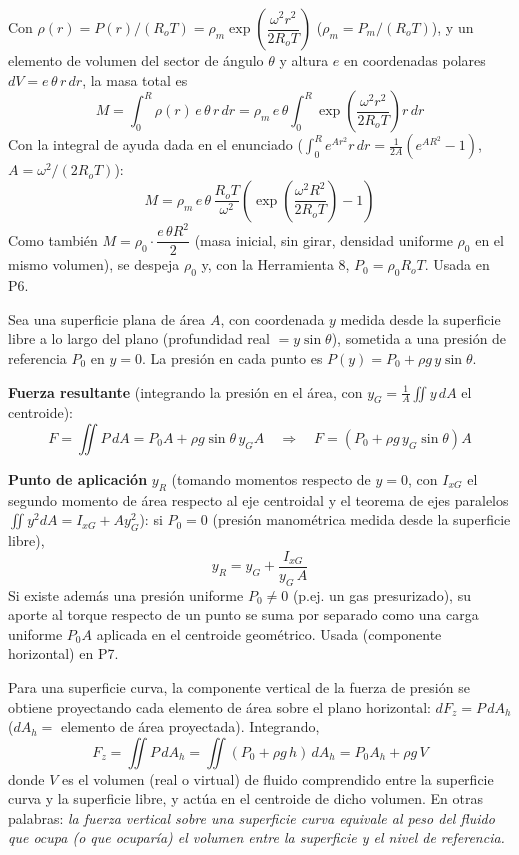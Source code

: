 \documentclass[12pt]{article}
\begin{document}
Con $\rho(r)=P(r)/(R_oT)=\rho_m\exp\!\left(\dfrac{\omega^2r^2}{2R_oT}\right)$
($\rho_m=P_m/(R_oT)$), y un elemento de volumen del sector de \'angulo $\theta$ y
altura $e$ en coordenadas polares $dV=e\,\theta\,r\,dr$, la masa total es
\[
M=\int_0^R \rho(r)\,e\,\theta\,r\,dr
=\rho_m\, e\,\theta\int_0^R \exp\!\left(\frac{\omega^2r^2}{2R_oT}\right) r\,dr
\]
Con la integral de ayuda dada en el enunciado
($\int_0^R e^{Ar^2}r\,dr=\frac{1}{2A}(e^{AR^2}-1)$, $A=\omega^2/(2R_oT)$):
\[
\boxed{M=\rho_m\,e\,\theta\,\frac{R_oT}{\omega^2}\left(\exp\!\left(\frac{\omega^2R^2}{2R_oT}\right)-1\right)}
\]
Como tambi\'en $M=\rho_0\cdot\dfrac{e\,\theta R^2}{2}$ (masa inicial, sin girar, densidad
uniforme $\rho_0$ en el mismo volumen), se despeja $\rho_0$ y, con la Herramienta 8,
$P_0=\rho_0 R_o T$. Usada en P6.


Sea una superficie plana de \'area $A$, con coordenada $y$ medida desde la superficie
libre a lo largo del plano (profundidad real $=y\sin\theta$), sometida a una presi\'on
de referencia $P_0$ en $y=0$. La presi\'on en cada punto es $P(y)=P_0+\rho g\,y\sin\theta$.

\textbf{Fuerza resultante} (integrando la presi\'on en el \'area, con
$y_G=\frac1A\iint y\,dA$ el centroide):
\[
F=\iint P\,dA=P_0A+\rho g\sin\theta\, y_G A
\quad\Longrightarrow\quad
\boxed{F=\left(P_0+\rho g\,y_G\sin\theta\right)A}
\]

\textbf{Punto de aplicaci\'on} $y_R$ (tomando momentos respecto de $y=0$, con
$I_{xG}$ el segundo momento de \'area respecto al eje centroidal y el teorema de ejes
paralelos $\iint y^2dA=I_{xG}+A y_G^2$): si $P_0=0$ (presi\'on manom\'etrica medida
desde la superficie libre),
\[
\boxed{y_R=y_G+\frac{I_{xG}}{y_G\,A}}
\]
Si existe adem\'as una presi\'on uniforme $P_0\neq0$ (p.ej. un gas presurizado), su
aporte al torque respecto de un punto se suma por separado como una carga uniforme
$P_0A$ aplicada en el centroide geom\'etrico. Usada (componente horizontal) en P7.


Para una superficie curva, la componente vertical de la fuerza de presi\'on se obtiene
proyectando cada elemento de \'area sobre el plano horizontal: $dF_z=P\,dA_h$ ($dA_h=$
elemento de \'area proyectada). Integrando,
\[
F_z=\iint P\,dA_h=\iint (P_0+\rho g\,h)\,dA_h=P_0A_h+\rho g\,V
\]
donde $V$ es el volumen (real o virtual) de fluido comprendido entre la superficie
curva y la superficie libre, y act\'ua en el centroide de dicho volumen. En otras
palabras: \emph{la fuerza vertical sobre una superficie curva equivale al peso del
fluido que ocupa (o que ocupar\'ia) el volumen entre la superficie y el nivel de
referencia.}
\end{document}
